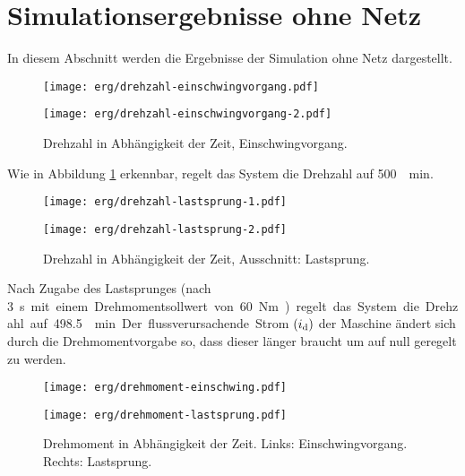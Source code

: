 \section{Simulationsergebnisse ohne Netz}\label{sec:sim-ohne-netz}

In diesem Abschnitt werden die Ergebnisse der Simulation ohne Netz dargestellt.

\begin{figure}[h!]
\begin{minipage}[t]{0.5\textwidth}
		\texttt{[image: erg/drehzahl-einschwingvorgang.pdf]}
\end{minipage}
\begin{minipage}[t]{0.5\textwidth}
		\texttt{[image: erg/drehzahl-einschwingvorgang-2.pdf]}
\end{minipage}
\caption{Drehzahl in Abhängigkeit der Zeit, Einschwingvorgang.}
\label{fig:drehzahl-einschwingvorgang}
\end{figure}

Wie in Abbildung \ref{fig:drehzahl-einschwingvorgang} erkennbar, regelt das System die Drehzahl auf \SI{500}{\per\minute}.

\begin{figure}[h!]
\begin{minipage}[t]{0.5\textwidth}
	\texttt{[image: erg/drehzahl-lastsprung-1.pdf]}
\end{minipage}
\begin{minipage}[t]{0.5\textwidth}
	\texttt{[image: erg/drehzahl-lastsprung-2.pdf]}
\end{minipage}
\caption{Drehzahl in Abhängigkeit der Zeit, Ausschnitt: Lastsprung.}
\label{fig:drehzahl-lastsprung}
\end{figure}
 
Nach Zugabe des Lastsprunges (nach \SI{3}s mit einem Drehmomentsollwert von \SI{60}Nm) regelt das System die Drehzahl auf \SI{498.5}{\per\minute}.
Der flussverursachende Strom $(i_{\mathrm{d}})$ der Maschine ändert sich durch die Drehmomentvorgabe so, dass dieser länger braucht um auf null geregelt zu werden.
 

\begin{figure}[h!]
	\begin{minipage}[t]{0.5\textwidth}
		\texttt{[image: erg/drehmoment-einschwing.pdf]}
	\end{minipage}
	\begin{minipage}[t]{0.5\textwidth}
		\texttt{[image: erg/drehmoment-lastsprung.pdf]}
	\end{minipage}
	\caption{Drehmoment in Abhängigkeit der Zeit. Links: Einschwingvorgang. Rechts: Lastsprung.}
	\label{fig:drehmoment}
\end{figure}

